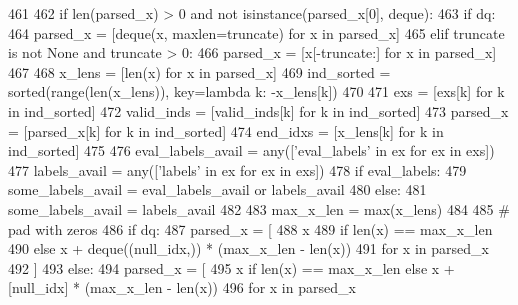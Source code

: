 \begin{DoxyCode}
461 
462         \textcolor{keywordflow}{if} len(parsed\_x) > 0 \textcolor{keywordflow}{and} \textcolor{keywordflow}{not} isinstance(parsed\_x[0], deque):
463             \textcolor{keywordflow}{if} dq:
464                 parsed\_x = [deque(x, maxlen=truncate) \textcolor{keywordflow}{for} x \textcolor{keywordflow}{in} parsed\_x]
465             \textcolor{keywordflow}{elif} truncate \textcolor{keywordflow}{is} \textcolor{keywordflow}{not} \textcolor{keywordtype}{None} \textcolor{keywordflow}{and} truncate > 0:
466                 parsed\_x = [x[-truncate:] \textcolor{keywordflow}{for} x \textcolor{keywordflow}{in} parsed\_x]
467 
468         x\_lens = [len(x) \textcolor{keywordflow}{for} x \textcolor{keywordflow}{in} parsed\_x]
469         ind\_sorted = sorted(range(len(x\_lens)), key=\textcolor{keyword}{lambda} k: -x\_lens[k])
470 
471         exs = [exs[k] \textcolor{keywordflow}{for} k \textcolor{keywordflow}{in} ind\_sorted]
472         valid\_inds = [valid\_inds[k] \textcolor{keywordflow}{for} k \textcolor{keywordflow}{in} ind\_sorted]
473         parsed\_x = [parsed\_x[k] \textcolor{keywordflow}{for} k \textcolor{keywordflow}{in} ind\_sorted]
474         end\_idxs = [x\_lens[k] \textcolor{keywordflow}{for} k \textcolor{keywordflow}{in} ind\_sorted]
475 
476         eval\_labels\_avail = any([\textcolor{stringliteral}{'eval\_labels'} \textcolor{keywordflow}{in} ex \textcolor{keywordflow}{for} ex \textcolor{keywordflow}{in} exs])
477         labels\_avail = any([\textcolor{stringliteral}{'labels'} \textcolor{keywordflow}{in} ex \textcolor{keywordflow}{for} ex \textcolor{keywordflow}{in} exs])
478         \textcolor{keywordflow}{if} eval\_labels:
479             some\_labels\_avail = eval\_labels\_avail \textcolor{keywordflow}{or} labels\_avail
480         \textcolor{keywordflow}{else}:
481             some\_labels\_avail = labels\_avail
482 
483         max\_x\_len = max(x\_lens)
484 
485         \textcolor{comment}{# pad with zeros}
486         \textcolor{keywordflow}{if} dq:
487             parsed\_x = [
488                 x
489                 \textcolor{keywordflow}{if} len(x) == max\_x\_len
490                 \textcolor{keywordflow}{else} x + deque((null\_idx,)) * (max\_x\_len - len(x))
491                 \textcolor{keywordflow}{for} x \textcolor{keywordflow}{in} parsed\_x
492             ]
493         \textcolor{keywordflow}{else}:
494             parsed\_x = [
495                 x \textcolor{keywordflow}{if} len(x) == max\_x\_len \textcolor{keywordflow}{else} x + [null\_idx] * (max\_x\_len - len(x))
496                 \textcolor{keywordflow}{for} x \textcolor{keywordflow}{in} parsed\_x

\end{DoxyCode}
